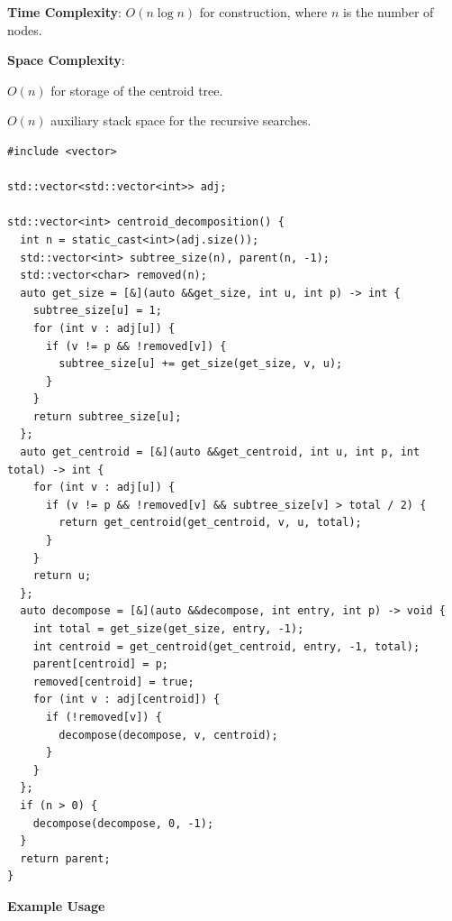 \textbf{Time Complexity}: $O(n \log n)$ for construction, where $n$ is the number of nodes.

\textbf{Space Complexity}:
\begin{compactitem}
  \item $O(n)$ for storage of the centroid tree.
  \item $O(n)$ auxiliary stack space for the recursive searches.
\end{compactitem}

\begin{lstlisting}[style=cpp]
#include <vector>

std::vector<std::vector<int>> adj;

std::vector<int> centroid_decomposition() {
  int n = static_cast<int>(adj.size());
  std::vector<int> subtree_size(n), parent(n, -1);
  std::vector<char> removed(n);
  auto get_size = [&](auto &&get_size, int u, int p) -> int {
    subtree_size[u] = 1;
    for (int v : adj[u]) {
      if (v != p && !removed[v]) {
        subtree_size[u] += get_size(get_size, v, u);
      }
    }
    return subtree_size[u];
  };
  auto get_centroid = [&](auto &&get_centroid, int u, int p, int total) -> int {
    for (int v : adj[u]) {
      if (v != p && !removed[v] && subtree_size[v] > total / 2) {
        return get_centroid(get_centroid, v, u, total);
      }
    }
    return u;
  };
  auto decompose = [&](auto &&decompose, int entry, int p) -> void {
    int total = get_size(get_size, entry, -1);
    int centroid = get_centroid(get_centroid, entry, -1, total);
    parent[centroid] = p;
    removed[centroid] = true;
    for (int v : adj[centroid]) {
      if (!removed[v]) {
        decompose(decompose, v, centroid);
      }
    }
  };
  if (n > 0) {
    decompose(decompose, 0, -1);
  }
  return parent;
}
\end{lstlisting}
\textbf{Example Usage}\par
